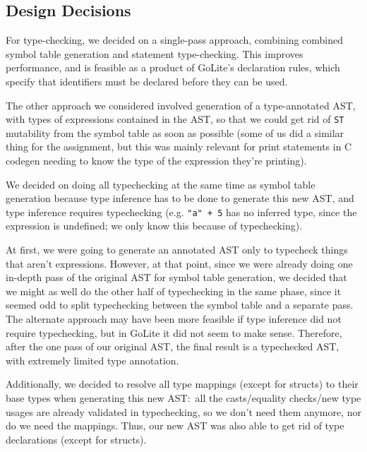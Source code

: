 \documentclass[11pt]{article}
\begin{document}
\subsection{Design Decisions}
For type-checking, we decided on a single-pass approach, combining
combined symbol table generation and statement type-checking. This
improves performance, and is feasible as a product of GoLite's
declaration rules, which specify that identifiers must be declared
before they can be used.

The other approach we considered involved generation of a
type-annotated AST, with types of expressions contained in the AST,
so that we could get rid of \texttt{ST} mutability from the symbol table as
soon as possible (some of us did a similar thing for the assignment,
but this was mainly relevant for print statements in C codegen
needing to know the type of the expression they're printing).

We decided on doing all typechecking at the same time as symbol
table generation because type inference has to be done to generate
this new AST, and type inference requires typechecking (e.g. \texttt{"a" +
	5} has no inferred type, since the expression is undefined; we only
know this because of typechecking).

At first, we were going to generate an annotated AST only to
typecheck things that aren't expressions. However, at that point,
since we were already doing one in-depth pass of the original AST
for symbol table generation, we decided that we might as well do the
other half of typechecking in the same phase, since it seemed odd to
split typechecking between the symbol table and a separate pass. The
alternate approach may have been more feasible if type inference did
not require typechecking, but in GoLite it did not seem to make
sense. Therefore, after the one pass of our original AST, the final
result is a typechecked AST, with extremely limited type annotation.

Additionally, we decided to resolve all type mappings (except for
structs) to their base types when generating this new AST:~all the
casts/equality checks/new type usages are already validated in
typechecking, so we don't need them anymore, nor do we need the
mappings. Thus, our new AST was also able to get rid of type
declarations (except for structs).
\end{document}
